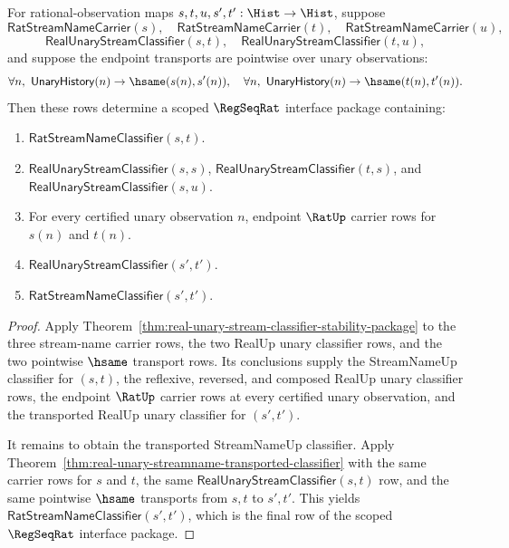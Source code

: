 \begin{theorem}
\label{thm:regseqrat-streamname-scoped-interface}
For rational-observation maps $s,t,u,s',t':\Hist\to\Hist$, suppose
$$
\mathsf{RatStreamNameCarrier}(s),\quad
\mathsf{RatStreamNameCarrier}(t),\quad
\mathsf{RatStreamNameCarrier}(u),
$$
$$
\mathsf{RealUnaryStreamClassifier}(s,t),\quad
\mathsf{RealUnaryStreamClassifier}(t,u),
$$
and suppose the endpoint transports are pointwise over unary observations:
$$
\forall n,\ \mathsf{UnaryHistory}(n)\to\hsame(s(n),s'(n)),
\quad
\forall n,\ \mathsf{UnaryHistory}(n)\to\hsame(t(n),t'(n)).
$$
Then these rows determine a scoped $\RegSeqRat$ interface package containing:
\begin{enumerate}
  \item $\mathsf{RatStreamNameClassifier}(s,t)$.
  \item $\mathsf{RealUnaryStreamClassifier}(s,s)$,
  $\mathsf{RealUnaryStreamClassifier}(t,s)$, and
  $\mathsf{RealUnaryStreamClassifier}(s,u)$.
  \item For every certified unary observation $n$, endpoint $\RatUp$
  carrier rows for $s(n)$ and $t(n)$.
  \item $\mathsf{RealUnaryStreamClassifier}(s',t')$.
  \item $\mathsf{RatStreamNameClassifier}(s',t')$.
\end{enumerate}
\end{theorem}
\begin{proof}
Apply Theorem~\ref{thm:real-unary-stream-classifier-stability-package} to
the three stream-name carrier rows, the two RealUp unary classifier rows, and
the two pointwise $\hsame$ transport rows. Its conclusions supply the
StreamNameUp classifier for $(s,t)$, the reflexive, reversed, and composed
RealUp unary classifier rows, the endpoint $\RatUp$ carrier rows at every
certified unary observation, and the transported RealUp unary classifier
for $(s',t')$.

It remains to obtain the transported StreamNameUp classifier. Apply
Theorem~\ref{thm:real-unary-streamname-transported-classifier} with the same
carrier rows for $s$ and $t$, the same
$\mathsf{RealUnaryStreamClassifier}(s,t)$ row, and the same pointwise
$\hsame$ transports from $s,t$ to $s',t'$. This yields
$\mathsf{RatStreamNameClassifier}(s',t')$, which is the final row of the
scoped $\RegSeqRat$ interface package.
\end{proof}

